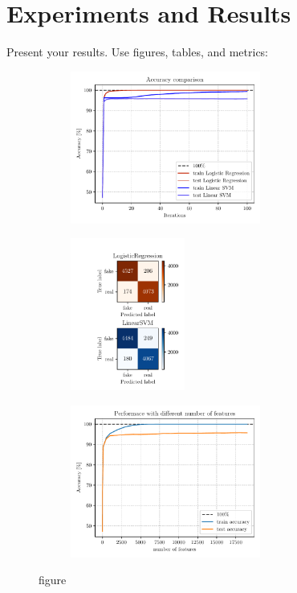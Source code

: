 \documentclass[10pt]{article}
\begin{document}
	\section{Experiments and Results}
	Present your results. Use figures, tables, and metrics:
	\blindtext
	\begin{figure}[htbp]
		\centering
		\begin{subfigure}[b]{0.37\textwidth}
			\includegraphics[height=5cm]{figures/model_comparison_accuracy_evolution.pdf}
			\caption{}
			\label{fig:a}
		\end{subfigure}
		\hfill
		\begin{subfigure}[b]{0.2\textwidth}
			\includegraphics[height=5cm]{figures/model_comparison_confusion_matrices.pdf}
			\caption{}
			\label{fig:b}
		\end{subfigure}
		\hfill
		\begin{subfigure}[b]{0.37\textwidth}
			\includegraphics[height=5cm]{figures/vectorization_comparison_feature_number_impact.pdf}
			\caption{}
			\label{fig:c}
		\end{subfigure}
		\caption{figure}
		\label{fig:comparison}
	\end{figure}
\end{document}
